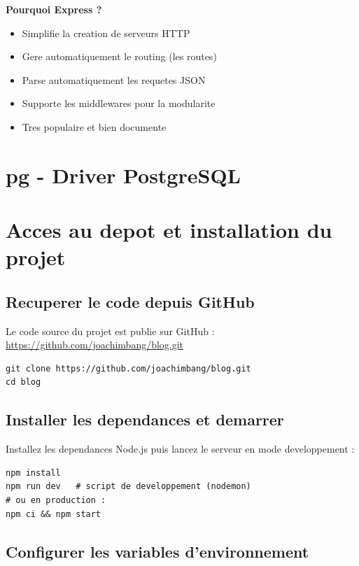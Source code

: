 \documentclass[a4paper,12pt]{book}
\begin{document}
\textbf{Pourquoi Express ?}
\begin{itemize}
    \item Simplifie la creation de serveurs HTTP
    \item Gere automatiquement le routing (les routes)
    \item Parse automatiquement les requetes JSON
    \item Supporte les middlewares pour la modularite
    \item Tres populaire et bien documente
\end{itemize}

\section{pg - Driver PostgreSQL}

\section{Acces au depot et installation du projet}

\subsection{Recuperer le code depuis GitHub}

Le code source du projet est publie sur GitHub : \url{https://github.com/joachimbang/blog.git}

\begin{lstlisting}[style=bash, caption=Cloner le depot]
git clone https://github.com/joachimbang/blog.git
cd blog
\end{lstlisting}

\subsection{Installer les dependances et demarrer}

Installez les dependances Node.js puis lancez le serveur en mode developpement :

\begin{lstlisting}[style=bash, caption=Installation et demarrage]
npm install
npm run dev   # script de developpement (nodemon)
# ou en production :
npm ci && npm start
\end{lstlisting}

\subsection{Configurer les variables d'environnement}
\end{document}
